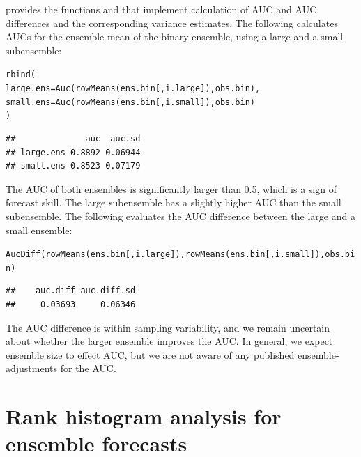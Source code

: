 \documentclass[article]{jss}\usepackage[]{graphicx}\usepackage[]{color}
\makeatletter
\newcommand{\hlstd}[1]{\textcolor[rgb]{0,0,0}{#1}}%
\newcommand{\hlkwc}[1]{\textcolor[rgb]{0,0.502,0.753}{#1}}%
\newcommand{\hlkwd}[1]{\textcolor[rgb]{0,0.267,0.4}{#1}}%
\newenvironment{kframe}{%
 \def\at@end@of@kframe{}%
 \ifinner\ifhmode%
  \def\at@end@of@kframe{\end{minipage}}%
  \begin{minipage}{\columnwidth}%
 \fi\fi%
 \def\FrameCommand##1{\hskip\@totalleftmargin \hskip-\fboxsep
 \colorbox{shadecolor}{##1}\hskip-\fboxsep
     \hskip-\linewidth \hskip-\@totalleftmargin \hskip\columnwidth}%
 \MakeFramed {\advance\hsize-\width
   \@totalleftmargin\z@ \linewidth\hsize
   \@setminipage}}%
 {\par\unskip\endMakeFramed%
 \at@end@of@kframe}
\newenvironment{knitrout}{}{} %
\makeatother
\begin{document}
 provides the functions  and  that implement calculation of AUC and AUC differences and the corresponding variance estimates.
The following calculates AUCs for the ensemble mean of the binary ensemble, using a large and a small subensemble:
%
\begin{knitrout}
\color{fgcolor}\begin{kframe}
\begin{alltt}
\hlkwd{rbind}\hlstd{(}
  \hlkwc{large.ens} \hlstd{=} \hlkwd{Auc}\hlstd{(}\hlkwd{rowMeans}\hlstd{(ens.bin[, i.large]), obs.bin),}
  \hlkwc{small.ens} \hlstd{=} \hlkwd{Auc}\hlstd{(}\hlkwd{rowMeans}\hlstd{(ens.bin[, i.small]), obs.bin)}
\hlstd{)}
\end{alltt}
\begin{verbatim}
##              auc  auc.sd
## large.ens 0.8892 0.06944
## small.ens 0.8523 0.07179
\end{verbatim}
\end{kframe}
\end{knitrout}
%
The AUC of both ensembles is significantly larger than 0.5, which is a sign of forecast skill.
The large subensemble has a slightly higher AUC than the small subensemble.
The following evaluates the AUC difference between the large and a small ensemble:
%
\begin{knitrout}
\color{fgcolor}\begin{kframe}
\begin{alltt}
\hlkwd{AucDiff}\hlstd{(}\hlkwd{rowMeans}\hlstd{(ens.bin[, i.large]),} \hlkwd{rowMeans}\hlstd{(ens.bin[, i.small]), obs.bin)}
\end{alltt}
\begin{verbatim}
##    auc.diff auc.diff.sd 
##     0.03693     0.06346
\end{verbatim}
\end{kframe}
\end{knitrout}
%
The AUC difference is within sampling variability, and we remain uncertain about whether the larger ensemble improves the AUC.
In general, we expect ensemble size to effect AUC, but we are not aware of any published ensemble-adjustments for the AUC. 



\section{Rank histogram analysis for ensemble forecasts}
\end{document}
